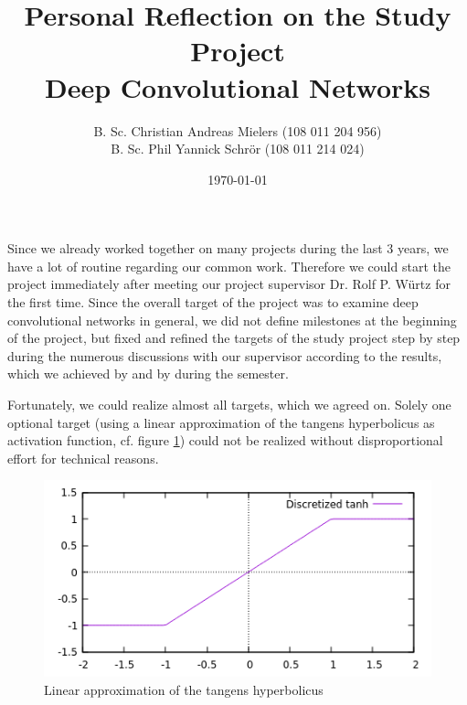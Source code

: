 \documentclass[11pt, a4paper]{article}
\title{Personal Reflection on the Study Project\\\textbf{Deep Convolutional Networks}}
\author{B. Sc. Christian Andreas Mielers (108 011 204 956)\\ B. Sc. Phil Yannick Schrör (108 011 214 024)}
\date{\today}
\begin{document}
\maketitle

Since we already worked together on many projects during the last 3 years, we have a lot of routine regarding our common work. Therefore we could start the project immediately after meeting our project supervisor Dr. Rolf P. Würtz for the first time.  Since the overall target of the project was to examine deep convolutional networks in general, we did not define milestones at the beginning of the project, but fixed and refined the targets of the study project step by step during the numerous discussions with our supervisor according to the results, which we achieved by and by during the semester.

Fortunately, we could realize almost all targets, which we agreed on. Solely one optional target (using a linear approximation of the tangens hyperbolicus as activation function, cf. figure \ref{fig:linear_tanh}) could not be realized without disproportional effort for technical reasons.

\begin{figure}[h!!!]
	\centering
	\includegraphics{discretized_tanh.png}
	\caption{Linear approximation of the tangens hyperbolicus}
	\label{fig:linear_tanh}
\end{figure}
\end{document}
